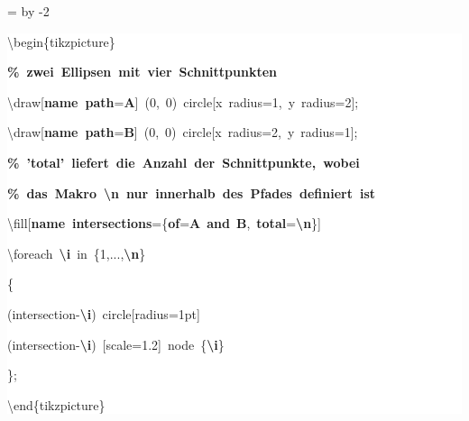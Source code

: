 \begingroup
\ttfamily
{}
=\textwidth
\advance{} by -2\fboxsep
\noindent
\colorbox{background}
{%
\parbox{\dimen255}
{%
\rule[-0.5ex]{0pt}{2.5ex}\hspace*{0.0em}\textbackslash{}begin\{tikzpicture\}\\
\rule[-0.5ex]{0pt}{2.5ex}\hspace*{1.0em}\textcolor{G}{\textbf{\%~zwei~Ellipsen~mit~vier~Schnittpunkten}}\\
\rule[-0.5ex]{0pt}{2.5ex}\hspace*{1.0em}\textbackslash{}draw[\textcolor{R}{\textbf{name~path}}=\textcolor{B}{\textbf{A}}]~(0,~0)~circle[x~radius=1,~y~radius=2];\\
\rule[-0.5ex]{0pt}{2.5ex}\hspace*{1.0em}\textbackslash{}draw[\textcolor{R}{\textbf{name~path}}=\textcolor{B}{\textbf{B}}]~(0,~0)~circle[x~radius=2,~y~radius=1];\\
\rule[-0.5ex]{0pt}{2.5ex}\hspace*{1.0em}\textcolor{G}{\textbf{\%~'total'~liefert~die~Anzahl~der~Schnittpunkte,~wobei}}\\
\rule[-0.5ex]{0pt}{2.5ex}\hspace*{1.0em}\textcolor{G}{\textbf{\%~das~Makro~\textbackslash{}n~nur~innerhalb~des~Pfades~definiert~ist}}\\
\rule[-0.5ex]{0pt}{2.5ex}\hspace*{1.0em}\textbackslash{}fill[\textcolor{R}{\textbf{name~intersections}}=\{\textcolor{R}{\textbf{of}}=\textcolor{B}{\textbf{A}}~\textcolor{R}{\textbf{and}}~\textcolor{B}{\textbf{B}},~\textcolor{R}{\textbf{total}}=\textcolor{B}{\textbf{\textbackslash{}n}}\}]\\
\rule[-0.5ex]{0pt}{2.5ex}\hspace*{3.5em}\textbackslash{}foreach~\textcolor{B}{\textbf{\textbackslash{}i}}~in~\{1,...,\textcolor{B}{\textbf{\textbackslash{}n}}\}\\
\rule[-0.5ex]{0pt}{2.5ex}\hspace*{3.5em}\{\\
\rule[-0.5ex]{0pt}{2.5ex}\hspace*{4.5em}(intersection{-}\textcolor{B}{\textbf{\textbackslash{}i}})~circle[radius=1pt]\\
\rule[-0.5ex]{0pt}{2.5ex}\hspace*{4.5em}(intersection{-}\textcolor{B}{\textbf{\textbackslash{}i}})~[scale=1.2]~node~\{\textcolor{B}{\textbf{\textbackslash{}i}}\}\\
\rule[-0.5ex]{0pt}{2.5ex}\hspace*{3.5em}\};\\
\rule[-0.5ex]{0pt}{2.5ex}\hspace*{0.0em}\textbackslash{}end\{tikzpicture\}}%
}%
\endgroup
